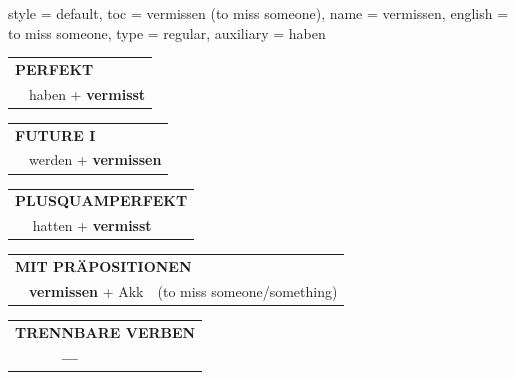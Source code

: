 \begin{verbentry}{
  style = {default},
  toc = {vermissen (to miss someone)},
  name = {vermissen},
  english = {to miss someone},
  type = {regular},
  auxiliary = {haben}
}
\vspace{10pt}

\begin{tabular}{rl}
\multicolumn{2}{l}{\textbf{PERFEKT}}\\
& haben + \textbf{vermisst}\\
\end{tabular}
\hfill
\begin{tabular}{rl}
\multicolumn{2}{l}{\textbf{FUTURE I}}\\
& werden + \textbf{vermissen}\\
\end{tabular}
\hfill
\begin{tabular}{rl}
\multicolumn{2}{l}{\textbf{PLUSQUAMPERFEKT}}\\
& hatten + \textbf{vermisst}\\
\end{tabular}

\vspace{10pt}

\begin{tabular}{lll}
\multicolumn{3}{l}{\textbf{MIT PRÄPOSITIONEN}}\\
& \textbf{vermissen} + Akk & (to miss someone/something)\\
\end{tabular}
\hfill
\begin{tabular}{lll}
\multicolumn{3}{l}{\textbf{TRENNBARE VERBEN}}\\
& \textbf{---} & \\
\end{tabular}
\vspace{-5pt}
\end{verbentry}

